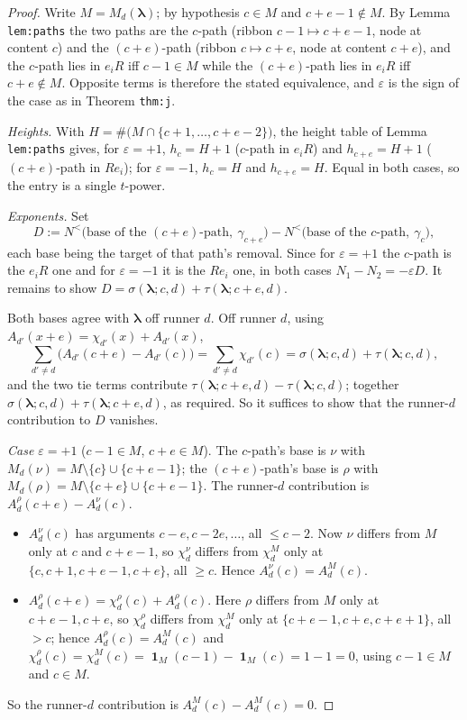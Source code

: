 \documentclass[11pt]{article}
\theoremstyle{definition}
\theoremstyle{remark}
\newcommand{\bl}{\boldsymbol{\lambda}}
\newcommand{\Nlt}{N^{<}}
\DeclareMathOperator{\Ind}{\mathbf 1}
\begin{document}
\begin{proof}
Write $M=M_d(\bl)$; by hypothesis $c\in M$ and $c+e-1\notin M$. By Lemma
\texttt{lem:paths} the two paths are the $c$-path (ribbon $c-1\mapsto c+e-1$, node at
content $c$) and the $(c+e)$-path (ribbon $c\mapsto c+e$, node at content $c+e$), and the
$c$-path lies in $e_iR$ iff $c-1\in M$ while the $(c+e)$-path lies in $e_iR$ iff
$c+e\notin M$. Opposite terms is therefore the stated equivalence, and $\varepsilon$ is
the sign of the case as in Theorem \texttt{thm:j}.

\emph{Heights.} With $H=\#\big(M\cap\{c+1,\dots,c+e-2\}\big)$, the height table of Lemma
\texttt{lem:paths} gives, for $\varepsilon=+1$, $h_c=H+1$ ($c$-path in $e_iR$) and
$h_{c+e}=H+1$ ($(c+e)$-path in $Re_i$); for $\varepsilon=-1$, $h_c=H$ and $h_{c+e}=H$.
Equal in both cases, so the entry is a single $t$-power.

\emph{Exponents.} Set
\[
D:=\Nlt\big(\text{base of the }(c+e)\text{-path},\ \gamma_{c+e}\big)
   -\Nlt\big(\text{base of the }c\text{-path},\ \gamma_{c}\big),
\]
each base being the target of that path's removal. Since for $\varepsilon=+1$ the
$c$-path is the $e_iR$ one and for $\varepsilon=-1$ it is the $Re_i$ one, in both cases
$N_1-N_2=-\varepsilon D$. It remains to show $D=\sigma(\bl;c,d)+\tau(\bl;c+e,d)$.

Both bases agree with $\bl$ off runner $d$. Off runner $d$, using
$A_{d'}(x+e)=\chi_{d'}(x)+A_{d'}(x)$,
\[
\sum_{d'\ne d}\big(A_{d'}(c+e)-A_{d'}(c)\big)=\sum_{d'\ne d}\chi_{d'}(c)
=\sigma(\bl;c,d)+\tau(\bl;c,d),
\]
and the two tie terms contribute $\tau(\bl;c+e,d)-\tau(\bl;c,d)$; together
$\sigma(\bl;c,d)+\tau(\bl;c+e,d)$, as required. So it suffices to show that the runner-$d$
contribution to $D$ vanishes.

\emph{Case $\varepsilon=+1$} ($c-1\in M$, $c+e\in M$). The $c$-path's base is
$\nu$ with $M_d(\nu)=M\setminus\{c\}\cup\{c+e-1\}$; the $(c+e)$-path's base is $\rho$
with $M_d(\rho)=M\setminus\{c+e\}\cup\{c+e-1\}$. The runner-$d$ contribution is
$A^{\rho}_d(c+e)-A^{\nu}_d(c)$.
\begin{itemize}
\item $A^{\nu}_d(c)$ has arguments $c-e,c-2e,\dots$, all $\le c-2$. Now $\nu$ differs
from $M$ only at $c$ and $c+e-1$, so $\chi^{\nu}_d$ differs from $\chi^{M}_d$ only at
$\{c,c+1,c+e-1,c+e\}$, all $\ge c$. Hence $A^{\nu}_d(c)=A^{M}_d(c)$.
\item $A^{\rho}_d(c+e)=\chi^{\rho}_d(c)+A^{\rho}_d(c)$. Here $\rho$ differs from $M$ only
at $c+e-1,c+e$, so $\chi^{\rho}_d$ differs from $\chi^{M}_d$ only at
$\{c+e-1,c+e,c+e+1\}$, all $>c$; hence $A^{\rho}_d(c)=A^{M}_d(c)$ and
$\chi^{\rho}_d(c)=\chi^{M}_d(c)=\Ind_M(c-1)-\Ind_M(c)=1-1=0$, using $c-1\in M$ and
$c\in M$.
\end{itemize}
So the runner-$d$ contribution is $A^{M}_d(c)-A^{M}_d(c)=0$.


\end{proof}
\end{document}
